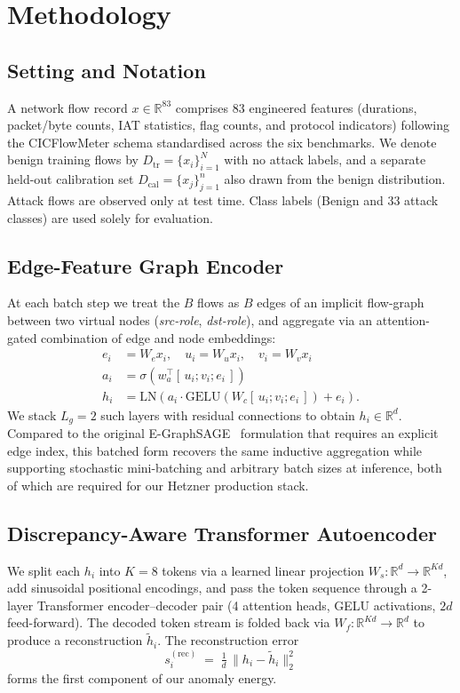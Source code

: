 \documentclass[journal,twoside]{IEEEtran}
\begin{document}
\section{Methodology}
\label{sec:method}

\subsection{Setting and Notation}
A network flow record $x \in \mathbb{R}^{83}$ comprises 83 engineered
features (durations, packet/byte counts, IAT statistics, flag counts,
and protocol indicators) following the CICFlowMeter schema standardised
across the six benchmarks.  We denote benign training flows by
$D_\text{tr} = \{x_i\}_{i=1}^N$ with no attack labels, and a separate
held-out calibration set $D_\text{cal} = \{x_j\}_{j=1}^n$ also drawn
from the benign distribution.  Attack flows are observed only at test
time.  Class labels (Benign and 33 attack classes) are used solely for
evaluation.

\subsection{Edge-Feature Graph Encoder}
\label{sec:method:graph}
At each batch step we treat the $B$ flows as $B$ edges of an implicit
flow-graph between two virtual nodes (\emph{src-role}, \emph{dst-role}),
and aggregate via an attention-gated combination of edge and node
embeddings:
\begin{align}
  e_i &= W_e x_i, \quad u_i = W_u x_i, \quad v_i = W_v x_i \\
  a_i &= \sigma\!\left( w_a^{\!\top} \! [\,u_i; v_i; e_i\,] \right) \\
  h_i &= \mathrm{LN}\!\left( a_i \cdot \mathrm{GELU}(W_c [\,u_i; v_i; e_i\,]) + e_i \right).
\end{align}
We stack $L_g{=}2$ such layers with residual connections to obtain
$h_i \in \mathbb{R}^d$.  Compared to the original
E-GraphSAGE~\cite{lo2022} formulation that requires an explicit edge
index, this batched form recovers the same inductive aggregation while
supporting stochastic mini-batching and arbitrary batch sizes at
inference, both of which are required for our Hetzner production stack.

\subsection{Discrepancy-Aware Transformer Autoencoder}
\label{sec:method:txae}
We split each $h_i$ into $K{=}8$ tokens via a learned linear projection
$W_s : \mathbb{R}^d \to \mathbb{R}^{Kd}$, add sinusoidal positional
encodings, and pass the token sequence through a 2-layer Transformer
encoder--decoder pair (4 attention heads, GELU activations,
$2d$ feed-forward).  The decoded token stream is folded back via
$W_f : \mathbb{R}^{Kd} \to \mathbb{R}^d$ to produce a reconstruction
$\tilde{h}_i$.  The reconstruction error
\begin{equation}
  s^{(\text{rec})}_i \;=\; \tfrac{1}{d} \, \| h_i - \tilde{h}_i \|_2^2
\end{equation}
forms the first component of our anomaly energy.
\end{document}
